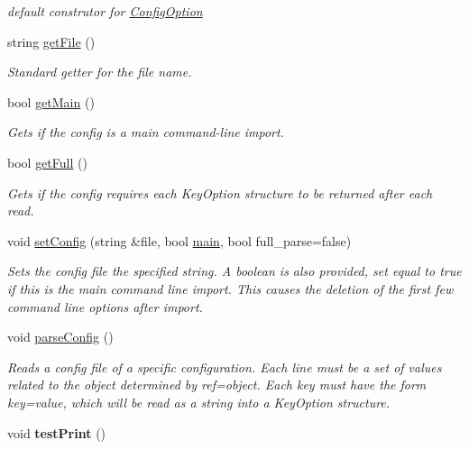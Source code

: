 \begin{DoxyCompactItemize}
\begin{DoxyCompactList}\small\item\em default construtor for \hyperlink{class_config_option}{Config\+Option} \end{DoxyCompactList}\item 
string \hyperlink{class_config_option_a3f8a4c5ed86342e5750e25b4e2effc1d}{get\+File} ()
\begin{DoxyCompactList}\small\item\em Standard getter for the file name. \end{DoxyCompactList}\item 
bool \hyperlink{class_config_option_a9efbb1ec989baccfa4476edf347381f3}{get\+Main} ()
\begin{DoxyCompactList}\small\item\em Gets if the config is a main command-\/line import. \end{DoxyCompactList}\item 
bool \hyperlink{class_config_option_a39e97c0cd7dc9451e4a518dabf38e132}{get\+Full} ()
\begin{DoxyCompactList}\small\item\em Gets if the config requires each Key\+Option structure to be returned after each read. \end{DoxyCompactList}\item 
void \hyperlink{class_config_option_a45bd25a839030bd722f5d9d2dbd7914e}{set\+Config} (string \&file, bool \hyperlink{_speciation_counter_8cpp_a3c04138a5bfe5d72780bb7e82a18e627}{main}, bool full\+\_\+parse=false)
\begin{DoxyCompactList}\small\item\em Sets the config file the specified string. A boolean is also provided, set equal to true if this is the main command line import. This causes the deletion of the first few command line options after import. \end{DoxyCompactList}\item 
void \hyperlink{class_config_option_a45cdefa1516c378e5a90803d594ccd34}{parse\+Config} ()\hypertarget{class_config_option_a45cdefa1516c378e5a90803d594ccd34}{}\label{class_config_option_a45cdefa1516c378e5a90803d594ccd34}

\begin{DoxyCompactList}\small\item\em Reads a config file of a specific configuration. Each line must be a set of values related to the object determined by ref=\textquotesingle{}object\textquotesingle{}. Each key must have the form key=value, which will be read as a string into a Key\+Option structure. \end{DoxyCompactList}\item 
void {\bfseries test\+Print} ()\hypertarget{class_config_option_a4f37e62b7f4ef9368f3eeea7e6385c49}{}\label{class_config_option_a4f37e62b7f4ef9368f3eeea7e6385c49}


\end{DoxyCompactItemize}
